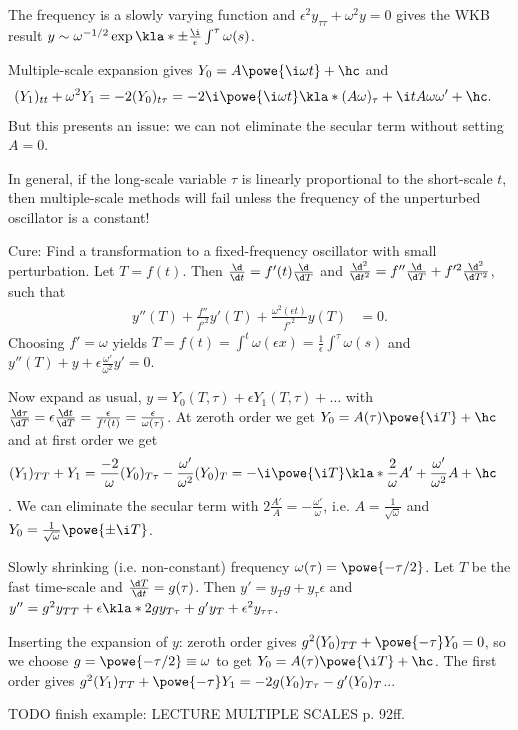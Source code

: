 \documentclass[english, parskip=full]{scrbook}
\newcommand{\note}[1]{\begin{tcolorbox}[colback=colorbackgroundnote,colframe=colornote, breakable,enhanced]#1\end{tcolorbox}}
\newcommand{\example}[3]{\begin{tcolorbox}[colback=colorbackgroundexample,colframe=colorexample, breakable,enhanced,title={\textbf{#1}: #2.}]#3\end{tcolorbox}}
\begin{document}
\example{WKB physical optics approximation}{$y''+\omega(\epsilon t)^2y=0$}{
The frequency is a slowly varying function and $\epsilon^2 y_{\tau\tau} + \omega^2 y = 0$ gives the WKB result $y\sim \omega^{-1/2} \exp\kla*{\pm \frac{\i}{\epsilon} \int^\tau \omega(s)}$.

Multiple-scale expansion gives $Y_0=A\powe{\i\omega t} + \hc$ and
\begin{align}
(Y_1)_{tt} + \omega^2 Y_1 &= -2 (Y_0)_{t\tau} = -2\i \powe{\i\omega t} \kla*{(A\omega)_\tau + \i t A\omega \omega'} + \hc.
\end{align}
But this presents an issue: we can not eliminate the secular term without setting $A=0$.
\note{In general, if the long-scale variable $\tau$ is linearly proportional to the short-scale $t$, then multiple-scale methods will fail unless the frequency of the unperturbed oscillator is a constant!}
Cure: Find a transformation to a fixed-frequency oscillator with small perturbation.
Let $T=f(t)$.
Then $\frac{\d}{\d t} = f'(t)\frac{\d}{\d T}$ and $\frac{\d^2}{\d t^2} = f'' \frac{\d}{\d T} + f'^2 \frac{\d^2}{\d T^2}$, such that
\begin{align}
y''(T) + \frac{f''}{f'^2} y'(T) + \frac{\omega^2(\epsilon t)}{f'^2} y(T) &= 0.
\end{align}
Choosing $f'=\omega$ yields $T=f(t)=\int^t \omega (\epsilon x) = \frac{1}{\epsilon} \int^\tau \omega(s)$ and $y''(T) + y + \epsilon \frac{\omega'}{\omega^2} y' = 0$.

Now expand as usual, $y=Y_0(T,\tau) + \epsilon Y_1(T,\tau) + \dots$ with $\frac{\d\tau}{\d T} = \epsilon \frac{\d t}{\d T} = \frac{\epsilon}{f'(t)} = \frac{\epsilon}{\omega(\tau)}$.
At zeroth order we get $Y_0=A(\tau) \powe{\i T} + \hc$ and at first order we get
\begin{align}
(Y_1)_{TT} + Y_1 &= \frac{-2}{\omega} (Y_0)_{T\tau} - \frac{\omega'}{\omega^2} (Y_0)_T = -\i \powe{\i T} \kla*{\frac{2}{\omega} A' + \frac{\omega'}{\omega^2}A} + \hc
\end{align}.
We can eliminate the secular term with $2\frac{A'}{A} = -\frac{\omega'}{\omega}$, i.e. $A=\frac{1}{\sqrt{\omega}}$ and $Y_0=\frac{1}{\sqrt{\omega}} \powe{\pm\i T}$.
}
\example{Aging spring}{$y''+\powe{-\epsilon t}y=0$}{
Slowly shrinking (i.e. non-constant) frequency $\omega(\tau) = \powe{-\tau/2}$.
Let $T$ be the fast time-scale and $\frac{\d T}{\d t} = g(\tau)$.
Then $y'=y_T g + y_\tau \epsilon$ and $y''=g^2 y_{TT} + \epsilon \kla*{2gy_{T\tau} + g'y_T} + \epsilon^2 y_{\tau\tau}$.

Inserting the expansion of $y$: zeroth order gives $g^2 (Y_0)_{TT} + \powe{-\tau} Y_0 = 0$, so we choose $g=\powe{-\tau/2} \equiv \omega$ to get $Y_0=A(\tau) \powe{\i T} + \hc$.
The first order gives $g^2 (Y_1)_{TT} + \powe{-\tau} Y_1 = -2g (Y_0)_{T\tau} - g' (Y_0)_T$...

TODO finish example: LECTURE MULTIPLE SCALES p. 92ff.
}
\end{document}
